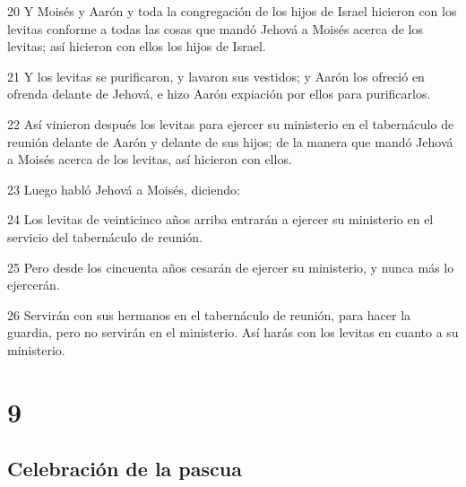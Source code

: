 \par 20 Y Moisés y Aarón y toda la congregación de los hijos de Israel hicieron con los levitas conforme a todas las cosas que mandó Jehová a Moisés acerca de los levitas; así hicieron con ellos los hijos de Israel.
\par 21 Y los levitas se purificaron, y lavaron sus vestidos; y Aarón los ofreció en ofrenda delante de Jehová, e hizo Aarón expiación por ellos para purificarlos.
\par 22 Así vinieron después los levitas para ejercer su ministerio en el tabernáculo de reunión delante de Aarón y delante de sus hijos; de la manera que mandó Jehová a Moisés acerca de los levitas, así hicieron con ellos.
\par 23 Luego habló Jehová a Moisés, diciendo:
\par 24 Los levitas de veinticinco años arriba entrarán a ejercer su ministerio en el servicio del tabernáculo de reunión.
\par 25 Pero desde los cincuenta años cesarán de ejercer su ministerio, y nunca más lo ejercerán.
\par 26 Servirán con sus hermanos en el tabernáculo de reunión, para hacer la guardia, pero no servirán en el ministerio. Así harás con los levitas en cuanto a su ministerio.

\chapter{9}

\section*{Celebración de la pascua}

